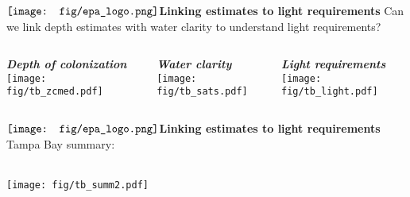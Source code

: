 \documentclass[serif]{beamer}\usepackage[]{graphicx}\usepackage[]{color}
\newcommand{\emtxt}[1]{\textbf{\textit{{\color{mypal4} #1}}}}
\begin{document}
\begin{frame}{$\vcenter{\hbox{\texttt{[image: fig/epa\_logo.png]}}}$\hspace{0.07in}\textbf{Linking estimates to light requirements}}
Can we link depth estimates with water clarity to understand light requirements?
\vspace{-0.2in}
\begin{columns}[t]
\footnotesize
\begin{column}{0.3\textwidth}
\begin{center}
\emtxt{Depth of colonization}
\texttt{[image: fig/tb\_zcmed.pdf]}
\end{center}
\end{column}
\begin{column}{0.3\textwidth}
\begin{center}
\emtxt{Water clarity}
\texttt{[image: fig/tb\_sats.pdf]}
\end{center}
\end{column}
\begin{column}{0.3\textwidth}
\begin{center}
\emtxt{Light requirements}
\texttt{[image: fig/tb\_light.pdf]}
\end{center}
\end{column}
\end{columns}
\end{frame}

\begin{frame}[t]{$\vcenter{\hbox{\texttt{[image: fig/epa\_logo.png]}}}$\hspace{0.07in}\textbf{Linking estimates to light requirements}}
Tampa Bay summary: \\~\\
\centerline{\texttt{[image: fig/tb\_summ2.pdf]}}
\end{frame}
\end{document}
